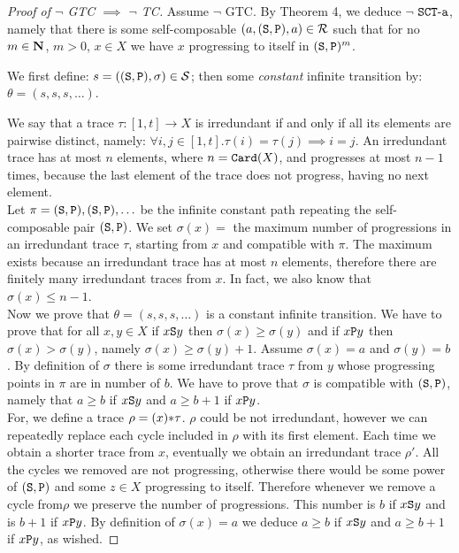 \documentclass{lmcs}
\begin{document}
\begin{proof}[Proof of $\neg$ GTC $\implies$ $\neg$ TC]
Assume $\neg$ GTC. By Theorem 4, \cite{Lee1} 
we deduce $\neg$ ${\tt SCT\mbox{-}a}$, namely
that there is some self-composable 
$(a,({\tt S},{\tt P}),a) \in {\mathcal R}$ such that for no $m \in {\bf N}$, $m>0$, 
$x \in X$ we have $x$ progressing to itself in $({\tt S},{\tt P})^m$.

We first define: $s = (({\tt S},{\tt P}),\sigma) \in {\mathcal S}$; then
some \emph{constant }infinite transition by: $\theta = (s, s, s, \ldots)$.

We say that a trace $\tau:[1,t] \rightarrow X$ 
is irredundant if and only if all its elements are 
pairwise distinct, namely: $\forall i,j \in [1,t]. \tau(i) = \tau(j) \implies i=j$. 
An irredundant trace has at most $n$ elements, where  $n = {\tt Card}(X)$, and
progresses at most $n-1$ times, because the last element of the trace
does not progress, having no next element.
\\

Let $\pi = ({\tt S},{\tt P}), ({\tt S},{\tt P}), \ldots$
be the infinite constant path repeating the self-composable pair $({\tt S},{\tt P})$.
We set $\sigma(x)=$ the maximum number of progressions in
an irredundant trace $\tau$, starting
 from $x$ and compatible with $\pi$. The maximum
exists because an irredundant trace has at most $n$ elements,
therefore there are finitely many irredundant traces from $x$. In fact,
we also know that $\sigma(x) \le n-1$.
\\

Now we prove that $\theta = (s, s, s, \ldots)$ is a constant infinite transition.
We have to prove that for all $x,y \in X$ if $x {\tt S} y$ then $\sigma(x) \ge
\sigma(y)$ and if $x {\tt P} y$ then $\sigma(x) >
\sigma(y)$, namely $\sigma(x) \ge \sigma(y)+1$. 
Assume $\sigma(x) = a$ and $\sigma(y) = b$.  
By definition of $\sigma$ there is some irredundant trace $\tau$ from $y$ 
whose progressing points in $\pi$ are in number of $b$. 
We have to prove that $\sigma$ is compatible with $({\tt S},{\tt P})$,
namely that $a \ge b$ if $x {\tt S} y$ and $a \ge b+1$ if $x {\tt P} y$.
\\

For, we define a trace $\rho = (x) {*} \tau$.
$\rho$ could be not irredundant, however we can repeatedly replace each
cycle included in $\rho$ with its first element. 
Each time we obtain a shorter trace from $x$, eventually we obtain an irredundant
trace $\rho'$. All the cycles we removed are not progressing,
otherwise there would be some power of $({\tt S},{\tt P})$ and some $z \in X$
 progressing to itself. Therefore whenever we remove a cycle from$\rho$
 we preserve the number of progressions. This number is $b$ if $x {\tt S} y$
 and is $b+1$ if $x {\tt P} y$. By definition of $\sigma(x) = a$ we deduce
 $a \ge b$ if $x {\tt S} y$ and $a \ge b+1$ if $x {\tt P} y$, as wished.
\end{proof}
\end{document}
